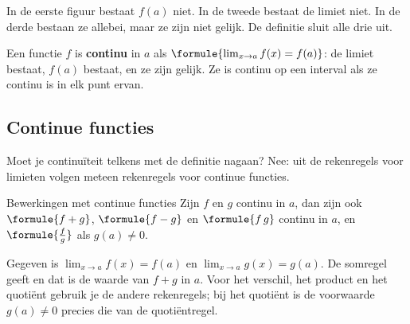 In de eerste figuur bestaat $f(a)$ niet. In de tweede bestaat de limiet niet. In de derde bestaan ze allebei, maar ze zijn niet gelijk. De definitie sluit alle drie uit.

\begin{theorie}
Een functie $f$ is \textbf{\textcolor{accent}{continu}} in $a$ als $\formule{\lim_{x \to a} f(x) = f(a)}$: de limiet bestaat, $f(a)$ bestaat, en ze zijn gelijk. Ze is continu op een interval als ze continu is in elk punt ervan.
\end{theorie}


\begin{oefeningen}
\end{oefeningen}

\subsection{Continue functies}

Moet je continuïteit telkens met de definitie nagaan? Nee: uit de rekenregels voor limieten volgen meteen rekenregels voor continue functies.

\begin{theorie}
\begin{stelling}{Bewerkingen met continue functies}
Zijn $f$ en $g$ continu in $a$, dan zijn ook $\formule{f + g}$, $\formule{f - g}$ en $\formule{f\,g}$ continu in $a$, en $\formule{\frac{f}{g}}$ als $g(a) \neq 0$.
\end{stelling}
\begin{bewijs}
Gegeven is $\lim_{x \to a} f(x) = f(a)$ en $\lim_{x \to a} g(x) = g(a)$. De somregel geeft
en dat is de waarde van $f + g$ in $a$. Voor het verschil, het product en het quotiënt gebruik je de andere rekenregels; bij het quotiënt is de voorwaarde $g(a) \neq 0$ precies die van de quotiëntregel.
\end{bewijs}
\end{theorie}

